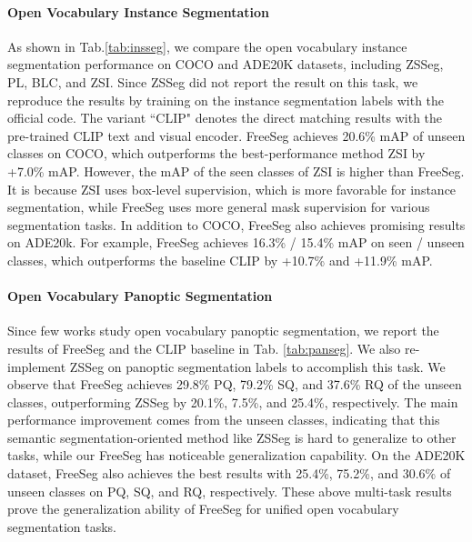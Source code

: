 \documentclass[10pt,twocolumn,letterpaper]{article}
\begin{document}
\paragraph{Open Vocabulary Instance Segmentation}
As shown in Tab.\ref{tab:insseg},  we compare the open vocabulary instance segmentation performance on COCO and ADE20K datasets, including ZSSeg\cite{xu2021simple}, PL\cite{rahman2020improved}, BLC\cite{zheng2020background}, and ZSI\cite{zheng2021zero}.
Since ZSSeg did not report the result on this task, we reproduce the results by training on the instance segmentation labels with the official code.
The variant ``CLIP" denotes the direct matching results with the pre-trained CLIP\cite{radford2021learning} text and visual encoder.
FreeSeg achieves 20.6\% mAP of unseen classes on COCO, which outperforms the best-performance method ZSI by +7.0\%  mAP. 
However, the mAP of the seen classes of ZSI is higher than FreeSeg.
It is because ZSI\cite{zheng2021zero} uses box-level supervision, which is more favorable for instance segmentation, while FreeSeg uses more general mask supervision for various segmentation tasks. 
In addition to COCO, FreeSeg also achieves promising results on ADE20k. For example, FreeSeg achieves 16.3\% / 15.4\%  mAP on seen / unseen classes, which outperforms the baseline CLIP by +10.7\%  and +11.9\% mAP.


\paragraph{Open Vocabulary Panoptic Segmentation}
Since few works study open vocabulary panoptic segmentation, we report the results of FreeSeg and the CLIP\cite{radford2021learning} baseline in Tab. \ref{tab:panseg}. We also re-implement ZSSeg\cite{xu2021simple} on panoptic segmentation labels to accomplish this task.
We observe that FreeSeg achieves 29.8\% PQ, 79.2\% SQ, and 37.6\% RQ of the unseen classes, outperforming ZSSeg by 20.1\%, 7.5\%, and 25.4\%, respectively. 
The main performance improvement comes from the unseen classes, indicating that this semantic segmentation-oriented method like ZSSeg is hard to generalize to other tasks, while our FreeSeg has noticeable generalization capability.
On the ADE20K dataset, FreeSeg also achieves the best results with 25.4\%, 75.2\%, and 30.6\% of unseen classes on PQ, SQ, and RQ, respectively. 
These above multi-task results prove the generalization ability of FreeSeg for unified open vocabulary segmentation tasks. 
\end{document}
